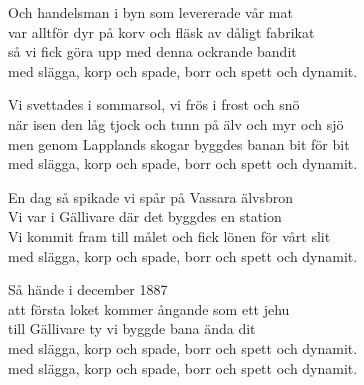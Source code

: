 \vspace{10pt}
Och handelsman i byn som levererade vår mat\\
var alltför dyr på korv och fläsk av dåligt fabrikat\\
så vi fick göra upp med denna ockrande bandit\\
med slägga, korp och spade, borr och spett och dynamit.\par
\vspace{10pt}
Vi svettades i sommarsol, vi frös i frost och snö\\
när isen den låg tjock och tunn på älv och myr och sjö\\
men genom Lapplands skogar byggdes banan bit för bit\\
med slägga, korp och spade, borr och spett och dynamit.\par
\vspace{10pt}
En dag så spikade vi spår på Vassara älvsbron\\
Vi var i Gällivare där det byggdes en station\\
Vi kommit fram till målet och fick lönen för vårt slit\\
med slägga, korp och spade, borr och spett och dynamit.\par
\vspace{10pt}
Så hände i december 1887\\
att första loket kommer ångande som ett jehu\\
till Gällivare ty vi byggde bana ända dit\\
med slägga, korp och spade, borr och spett och dynamit.\\
med slägga, korp och spade, borr och spett och dynamit.
